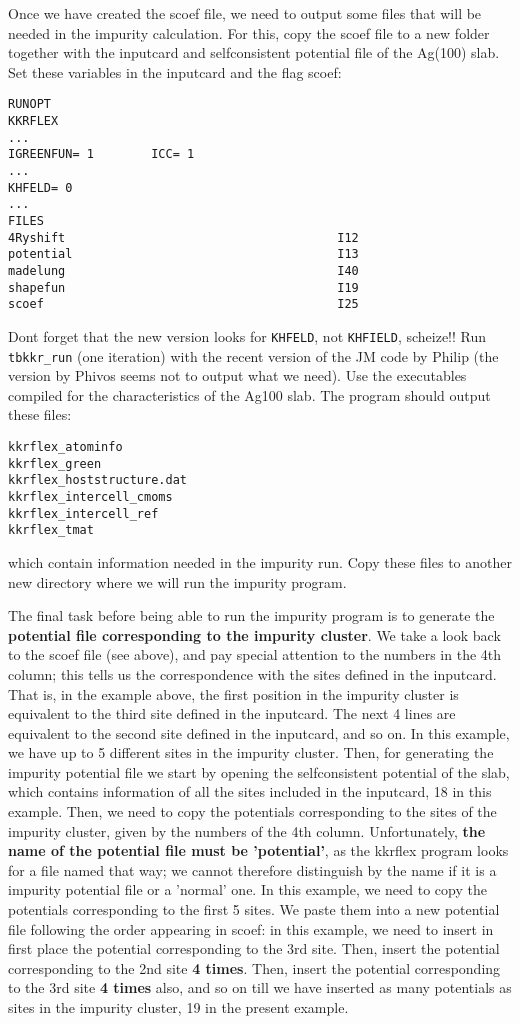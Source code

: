 \documentclass[a4paper,10pt,fullpage]{report}
\begin{document}
Once we have created the scoef file,
we need to output some files that will be needed in the impurity calculation. 
For this, copy the scoef file to a new folder together with the inputcard 
and selfconsistent potential file of the Ag(100) slab. 
Set these variables in the inputcard and the flag scoef:
\begin{verbatim}
RUNOPT
KKRFLEX
...
IGREENFUN= 1        ICC= 1  
...
KHFELD= 0
...
FILES
4Ryshift                                      I12
potential                                     I13
madelung                                      I40
shapefun                                      I19
scoef                                         I25
\end{verbatim}
Dont forget that the new version looks for \verb|KHFELD|, not \verb|KHFIELD|, scheize!!
Run \verb|tbkkr_run| (one iteration) with the recent version of the JM code by Philip 
(the version by Phivos seems not to output what we need). 
Use the executables compiled for the characteristics of the Ag100 slab. 
The program should output these files:
\begin{verbatim}
kkrflex_atominfo
kkrflex_green
kkrflex_hoststructure.dat
kkrflex_intercell_cmoms
kkrflex_intercell_ref
kkrflex_tmat
\end{verbatim}
which contain information needed in the impurity run.
Copy these files to another new directory where we will run the impurity program.


The final task before being able to run the impurity 
program is to generate the \textbf{potential file corresponding to the 
impurity cluster}.
We take a look back to the  scoef file (see above), and pay special attention to 
the numbers in the 4th column; this tells us
the correspondence with the sites defined in the inputcard. 
That is, in the example above, the first position in the impurity cluster 
is equivalent to the third site defined in the inputcard. The next 4 lines are equivalent
to the second site defined in the inputcard, and so on.
In this example, we have up to 5 different sites in the impurity cluster. Then, 
for generating the impurity potential file we start by opening the 
selfconsistent potential of the slab, which contains information of
all the sites included in the inputcard, 18 in this example. 
Then, we need to copy the potentials corresponding to the sites 
of the impurity cluster, given by the numbers of the 4th column.
Unfortunately, \textbf{the name of the potential file
must be 'potential'}, as the kkrflex program looks
for a file named that way; we cannot therefore distinguish 
by the name if it is a impurity potential file or a 
'normal' one.
In this example, we need to copy the potentials corresponding to the 
first 5 sites. We paste them into a new potential file  
following the 
order appearing in scoef: in this example, we need to insert in first place
the potential corresponding to the 3rd site. Then, insert the potential 
corresponding to the 2nd site \textbf{4 times}. Then, insert the potential 
corresponding to the 3rd site \textbf{4 times} also, and so on till we have inserted
as many potentials as sites in the impurity cluster, 19 in the present example.
\end{document}
